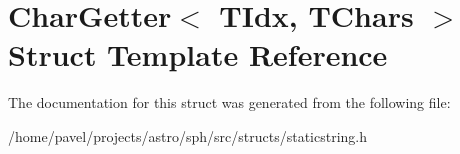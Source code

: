 \hypertarget{structCharGetter}{}\section{Char\+Getter$<$ T\+Idx, T\+Chars $>$ Struct Template Reference}
\label{structCharGetter}


The documentation for this struct was generated from the following file\+:\begin{DoxyCompactItemize}
\item 
/home/pavel/projects/astro/sph/src/structs/staticstring.\+h\end{DoxyCompactItemize}
